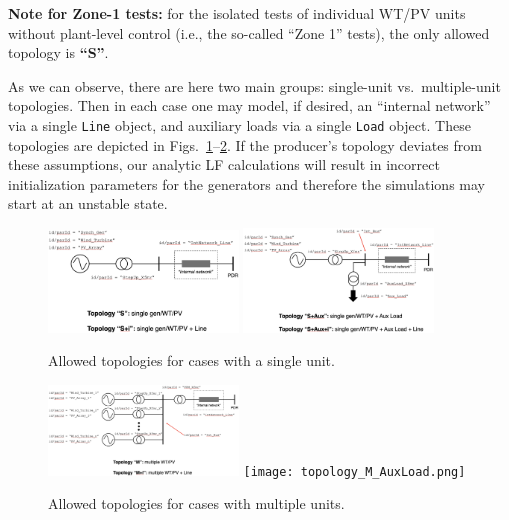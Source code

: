 \documentclass[a4paper,11pt]{article}
\newcommand{\code}[1]{\texttt{#1}}  %
\begin{document}
\noindent\textbf{Note for Zone-1 tests:} for the isolated tests of individual WT/PV
units without plant-level control (i.e., the so-called ``Zone 1'' tests), the only
allowed topology is \textbf{``S''}.

As we can observe, there are here two main groups: single-unit vs.\ multiple-unit
topologies. Then in each case one may model, if desired, an ``internal network'' via a
single \code{Line} object, and auxiliary loads via a single \code{Load} object.  These
topologies are depicted in Figs.~\ref{fig:topoS}--\ref{fig:topoM}. If the producer's
topology deviates from these assumptions, our analytic LF calculations will result in
incorrect initialization parameters for the generators and therefore the simulations may
start at an unstable state.

\begin{figure}[ht]
  \centering
  \hfill
  \includegraphics[width=0.45\textwidth]{topology_S.png}
  \hfill
  \includegraphics[width=0.45\textwidth]{topology_S_AuxLoad.png}
  \hfill
  \caption{Allowed topologies for cases with a single unit.}
  \label{fig:topoS} 
\end{figure}

\begin{figure}[ht]
  \centering
  \hfill
  \includegraphics[width=0.45\textwidth]{topology_M.png}
  \hfill
  \texttt{[image: topology\_M\_AuxLoad.png]}
  \hfill
  \caption{Allowed topologies for cases with multiple units.}
  \label{fig:topoM} 
\end{figure}
\end{document}
